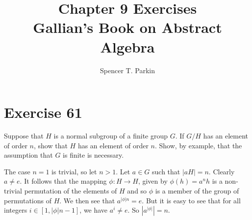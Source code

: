 \documentclass[12pt]{article}
\title{Chapter 9 Exercises\\Gallian's Book on Abstract Algebra}
\author{Spencer T. Parkin}
\begin{document}
\maketitle

\section*{Exercise 61}

Suppose that $H$ is a normal subgroup of a finite group $G$.
If $G/H$ has an element of order $n$, show that $H$ has an element of order $n$.
Show, by example, that the assumption that $G$ is finite is necessary.

The case $n=1$ is trivial, so let $n>1$.  Let $a\in G$ such that $|aH|=n$.  Clearly $a\neq e$.
It follows that the mapping $\phi:H\to H$, given by $\phi(h)=a^nh$ is a non-trivial permutation of
the elements of $H$ and so $\phi$ is a member of the group of permutations of $H$.
We then see that $a^{|\phi|n}=e$.  But it is easy to see that for all
integers $i\in [1,|\phi|n-1]$, we have $a^i\neq e$.  So $|a^{|\phi|}|=n$.
\end{document}
